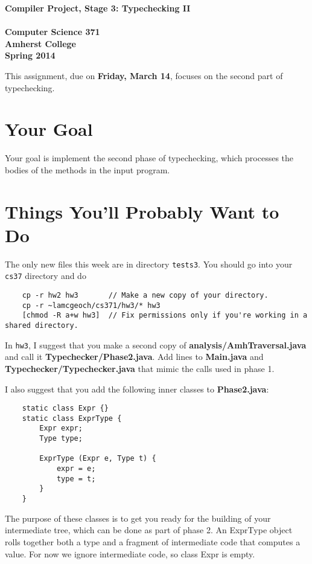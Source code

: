 \documentclass[11pt]{article}
\begin{document}
\begin{center}
\Large \bf Compiler Project, Stage 3: Typechecking  II\\ \mbox{} \\
\large Computer Science 371 \\
\large Amherst College \\
\large Spring 2014
\end{center}

This assignment, due on {\bf Friday, March 14}, focuses on the second part of typechecking.

\section{Your Goal}

Your goal is implement the second phase of typechecking, which processes the bodies of the methods in the input program.

\section{Things You'll Probably Want to Do}

The only new files this week are in directory \verb'tests3'.  You should go into your {\tt cs37} directory and do
\begin{verbatim}
    cp -r hw2 hw3       // Make a new copy of your directory.
    cp -r ~lamcgeoch/cs371/hw3/* hw3
    [chmod -R a+w hw3]  // Fix permissions only if you're working in a shared directory.
\end{verbatim}

In {\tt hw3}, I suggest that you make a second copy of {\bf analysis/AmhTraversal.java} and call it 
{\bf Typechecker/Phase2.java}.  Add lines to {\bf Main.java} and {\bf Typechecker/Typechecker.java} that mimic the calls used in phase 1.

I also suggest that you add the following inner classes to {\bf Phase2.java}:
\begin{verbatim}
    static class Expr {}
    static class ExprType {
        Expr expr;
        Type type;
        
        ExprType (Expr e, Type t) {
            expr = e;
            type = t;
        }
    }
\end{verbatim}

The purpose of these classes is to get you ready for the building of your intermediate tree, which can be done as part of phase 2.  An ExprType object rolls together both a type and a fragment of intermediate code that computes a value.  For now we ignore intermediate code, so class Expr is empty.
\end{document}
